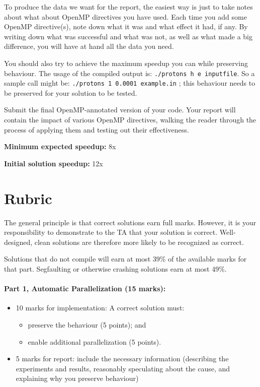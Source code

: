 \documentclass[letterpaper,10pt]{article}
\begin{document}
To produce the data we want for the report, the easiest way is just to take notes about what about OpenMP directives you have used. Each time you add some OpenMP directive(s), note down what it was and what effect it had, if any. By writing down what was successful and what was not, as well as what made a big difference, you will have at hand all the data you need.

You should also try to achieve the maximum speedup you can while preserving behaviour. The usage of the compiled output is: \texttt{./protons h e inputfile}. So a sample call might be: \texttt{./protons 1 0.0001 example.in} ; this behaviour needs to be preserved for your solution to be tested.

Submit the final OpenMP-annotated version of your code. Your report will contain the impact of various OpenMP directives, walking the reader through the process of applying them and testing out their effectiveness.

\squishlist
  \item {\bf Minimum expected speedup:} 8x
  \item {\bf Initial solution speedup:} 12x
\squishend


\section*{Rubric}

The general principle is that correct solutions earn full marks.
However, it is your responsibility to demonstrate to the TA
that your solution is correct. Well-designed, clean solutions 
are therefore more likely to be recognized as correct. 

Solutions that do not compile will earn at most 39\% of the available
marks for that part. Segfaulting or otherwise crashing solutions earn
at most 49\%.

\paragraph{Part 1, Automatic Parallelization (15 marks):}  
\begin{itemize}
\item 10 marks for implementation: A correct solution must:
\begin{itemize}
	\item preserve the behaviour (5 points); and
	\item enable additional parallelization (5 points).
\end{itemize}
 
\item 5 marks for report: include the necessary information
(describing the experiments and results, reasonably speculating about
the cause, and explaining why you preserve behaviour)
\end{itemize}
\end{document}
